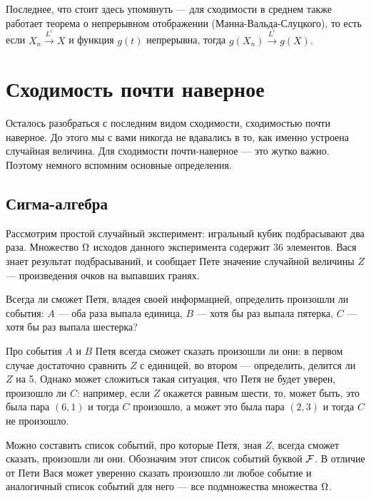 \documentclass[12pt, a4paper, oneside]{article}
\begin{document}
Последнее, что стоит здесь упомянуть --- для сходимости в среднем также работает теорема о непрерывном отображении (Манна-Вальда-Слуцкого), то есть если $X_n \overset{L^r}{\to} X$ и функция $g(t)$ непрерывна, тогда $g(X_n) \overset{L^r}{\to} g(X).$

\section{Сходимость почти наверное} 

Осталось разобраться с последним видом сходимости, сходимостью почти наверное. До этого мы с вами никогда не вдавались в то, как именно устроена случайная величина. Для сходимости почти-наверное --- это жутко важно. Поэтому немного вспомним основные определения. 

\subsection{Сигма-алгебра} 

\begin{problem}{}
Рассмотрим простой случайный эксперимент: игральный кубик подбрасывают два раза. Множество $\Omega$ исходов данного эксперимента содержит $36$ элементов. Вася знает результат подбрасываний, и сообщает Пете значение случайной величины $Z$ --- произведения очков на выпавших гранях.

Всегда ли сможет Петя, владея своей информацией, определить произошли ли события: $A$ --- оба раза выпала единица, $B$ --- хотя бы раз выпала пятерка, $C$ --- хотя бы раз выпала шестерка?
\end{problem} 

\begin{sol} 
Про события $A$ и $B$ Петя всегда сможет сказать произошли ли они: в первом случае достаточно сравнить $Z$ с единицей, во втором --- определить, делится ли $Z$ на 5. Однако может сложиться такая ситуация, что Петя не будет уверен, произошло ли $C$: например, если $Z$ окажется равным шести, то, может быть, это была пара $(6,1)$ и тогда $C$ произошло, а может это была пара $(2,3)$ и тогда $C$ не произошло.

Можно составить список событий, про которые Петя, зная $Z$, всегда сможет сказать, произошли ли они. Обозначим этот список событий буквой $\mathcal{F}$. В отличие от Пети Вася может уверенно сказать произошло ли любое событие и аналогичный список событий для него --- все подмножества множества $\Omega$.
\end{sol} 
\end{document}
